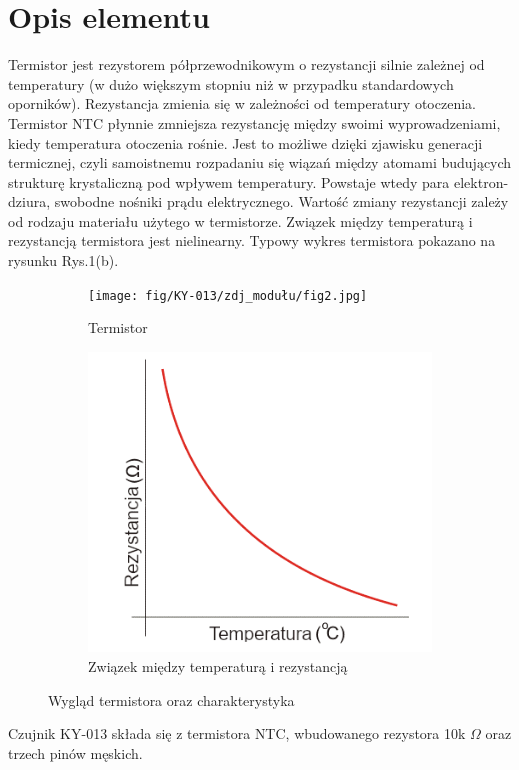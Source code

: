 \documentclass[11pt, a4paper]{article}
\author{Antoni Borowski}
\institute{Instytut Robotyki i Inteligencji Maszynowej}
\begin{document}
\newpage

\section*{Opis elementu} 
 Termistor jest rezystorem półprzewodnikowym o rezystancji silnie zależnej od temperatury (w dużo większym stopniu niż w przypadku standardowych oporników). Rezystancja zmienia się w zależności od temperatury otoczenia. Termistor NTC płynnie zmniejsza rezystancję między swoimi wyprowadzeniami, kiedy temperatura otoczenia rośnie. Jest to możliwe dzięki zjawisku generacji termicznej, czyli samoistnemu rozpadaniu się wiązań między atomami budujących strukturę krystaliczną pod wpływem temperatury. Powstaje wtedy para elektron-dziura, swobodne nośniki prądu elektrycznego. Wartość zmiany rezystancji zależy od rodzaju materiału użytego w termistorze. Związek między temperaturą i rezystancją termistora jest nielinearny. Typowy wykres termistora pokazano na rysunku Rys.1(b).
\vspace{0.5cm}
\begin{figure}[h!]
\centering
\begin{subfigure}{.5\textwidth}
  \centering
  \texttt{[image: fig/KY-013/zdj\_modułu/fig2.jpg]}
  \caption{Termistor \cite{ArduinoModules:grab}}
  \label{fig:sub1}
\end{subfigure}%
\begin{subfigure}{.5\textwidth}
  \centering
  \includegraphics[width=0.7\linewidth]{fig/KY-013/zasada_dzialania/wykress.png}
  \caption{Związek między temperaturą i rezystancją \cite{bot:wykres}}
  \label{fig:sub2}
\end{subfigure}
\caption{Wygląd termistora oraz charakterystyka}
\label{fig:test}
\end{figure}
\newline
Czujnik KY-013 składa się z termistora NTC, wbudowanego rezystora 10k $\Omega$ oraz trzech pinów męskich.
\end{document}
